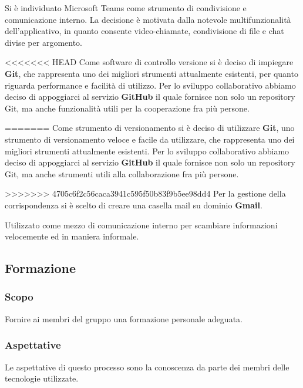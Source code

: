 				Si è individuato Microsoft Teams come strumento di condivisione e comunicazione interno. La decisione è motivata dalla notevole multifunzionalità dell'applicativo, in quanto consente video-chiamate, condivisione di file e chat divise per argomento.
				
<<<<<<< HEAD
				Come software di controllo versione si è deciso di impiegare \textbf{Git}, che rappresenta uno dei migliori strumenti attualmente esistenti, per quanto riguarda performance e facilità di utilizzo. Per lo sviluppo collaborativo abbiamo deciso di appoggiarci al servizio \textbf{GitHub} il quale fornisce non solo un repository Git, ma anche funzionalità utili per la cooperazione fra più persone.
							
=======
				Come strumento di versionamento si è deciso di utilizzare \textbf{Git}, uno strumento di versionamento veloce e facile da utilizzare, che rappresenta uno dei migliori strumenti attualmente esistenti. Per lo sviluppo collaborativo abbiamo deciso di appoggiarci al servizio \textbf{GitHub} il quale fornisce non solo un repository Git, ma anche strumenti utili alla collaborazione fra più persone.
			
>>>>>>> 4705c6f2c56caca3941c595f50b83f9b5ee98dd4
				Per la gestione della corrispondenza si è scelto di creare una casella mail su dominio \textbf{Gmail}.
				
				Utilizzato come mezzo di comunicazione interno per scambiare informazioni velocemente ed in maniera informale.
				

	\subsection{Formazione}
	
		\subsubsection{Scopo}
		Fornire ai membri del gruppo una formazione personale adeguata.
		
		\subsubsection{Aspettative}
		Le aspettative di questo processo sono la conoscenza da parte dei membri delle tecnologie utilizzate.
		
